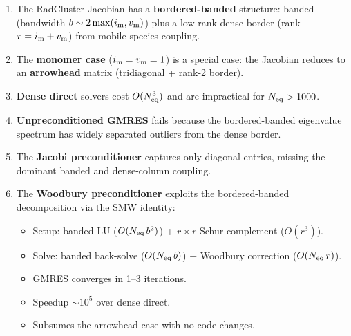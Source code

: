 \documentclass[11pt]{article}
\newcommand{\Neq}{N_{\rm eq}}
\newcommand{\im}{i_{\rm m}}
\newcommand{\vm}{v_{\rm m}}
\newcommand{\bw}{b}
\newcommand{\rank}{r}
\begin{document}
\begin{enumerate}
  \item The RadCluster Jacobian has a \textbf{bordered-banded}
    structure: banded (bandwidth $\bw \sim 2\max(\im, \vm)$) plus
    a low-rank dense border (rank $\rank = \im + \vm$) from
    mobile species coupling.

  \item The \textbf{monomer case} ($\im = \vm = 1$) is a special
    case: the Jacobian reduces to an \textbf{arrowhead} matrix
    (tridiagonal + rank-2 border).

  \item \textbf{Dense direct} solvers cost $O(\Neq^{3})$ and are
    impractical for $\Neq > 1000$.

  \item \textbf{Unpreconditioned GMRES} fails because the
    bordered-banded eigenvalue spectrum has widely separated
    outliers from the dense border.

  \item The \textbf{Jacobi preconditioner} captures only diagonal
    entries, missing the dominant banded and dense-column coupling.

  \item The \textbf{Woodbury preconditioner} exploits the
    bordered-banded decomposition via the SMW identity:
    \begin{itemize}
      \item Setup: banded LU ($O(\Neq\,\bw^{2})$) +
        $\rank \times \rank$ Schur complement ($O(\rank^{3})$).
      \item Solve: banded back-solve ($O(\Neq\,\bw)$) +
        Woodbury correction ($O(\Neq\,\rank)$).
      \item GMRES converges in 1--3 iterations.
      \item Speedup $\sim 10^{5}$ over dense direct.
      \item Subsumes the arrowhead case with no code changes.
    \end{itemize}
\end{enumerate}
\end{document}
